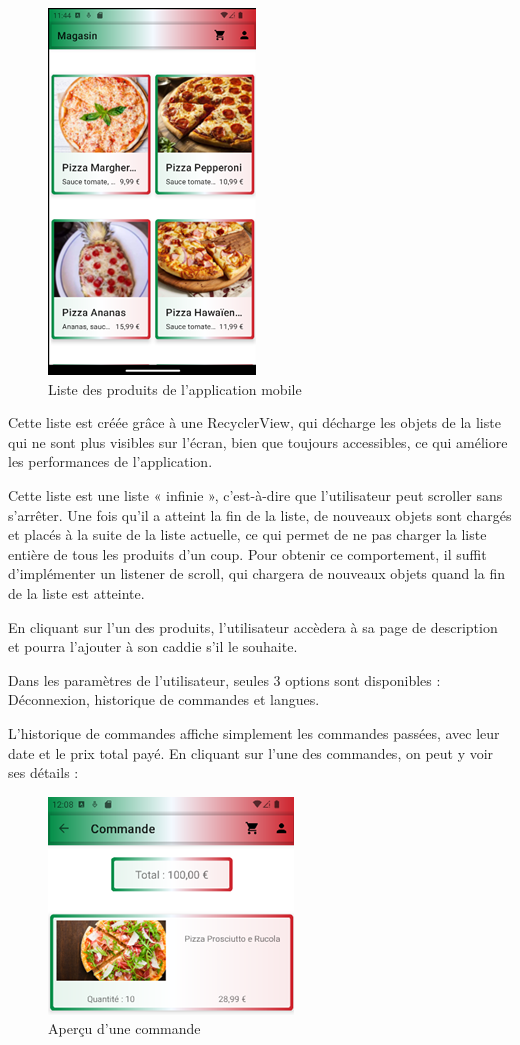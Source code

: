 \begin{figure}[H]
    \centering
    \includegraphics[scale=.9]{./img/joey-img-6.png}
    \caption{Liste des produits de l'application mobile}
    \label{fig:poc-pizzas}
\end{figure}

Cette liste est créée grâce à une RecyclerView, qui décharge les objets de la liste qui ne sont plus visibles sur l'écran, bien que toujours accessibles, ce qui améliore les performances de
l'application.

Cette liste est une liste « infinie », c'est-à-dire que l'utilisateur peut scroller sans s'arrêter. Une fois qu'il a atteint la fin de la liste, de nouveaux objets sont chargés et placés à la suite de la liste actuelle, ce qui permet de ne pas charger la liste entière de tous les produits d'un coup. Pour obtenir ce comportement, il suffit d'implémenter un listener de scroll, qui chargera de nouveaux objets quand la fin de la liste est atteinte.

En cliquant sur l'un des produits, l'utilisateur accèdera à sa page de description et pourra l'ajouter à son caddie s'il le souhaite.

Dans les paramètres de l'utilisateur, seules 3 options sont disponibles : Déconnexion, historique de commandes et langues.

L'historique de commandes affiche simplement les commandes passées, avec leur date et le prix total payé. En cliquant sur l'une des commandes, on peut y voir ses détails :

\begin{figure}[H]
    \centering
    \includegraphics[scale=.9]{./img/joey-img-7.png}
    \caption{Aperçu d'une commande}
    \label{fig:poc-commande}
\end{figure}

